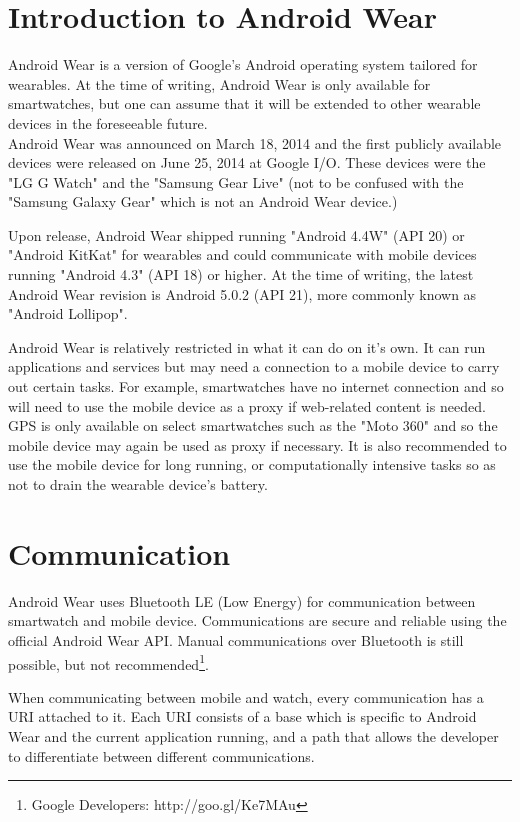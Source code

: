 \section{Introduction to Android Wear}

Android Wear is a version of Google's Android operating system tailored for
wearables. At the time of writing, Android Wear is only available for
smartwatches, but one can assume that it will be extended to other wearable
devices in the foreseeable future.\\
Android Wear was announced on March 18, 2014 and the first publicly available
devices were released on June 25, 2014 at Google I/O. These devices were the
"LG G Watch" and the "Samsung Gear Live" (not to be confused with the
"Samsung Galaxy Gear" which is not an Android Wear device.)

Upon release, Android Wear shipped running "Android 4.4W" (API 20) or "Android
KitKat" for wearables and could communicate with mobile devices running
"Android 4.3" (API 18) or higher. At the time of writing, the latest Android
Wear revision is Android 5.0.2 (API 21), more commonly known as "Android
Lollipop".

Android Wear is relatively restricted in what it can do on it's own. It can run
applications and services but may need a connection to a mobile device to carry
out certain tasks. For example, smartwatches have no internet connection and so
will need to use the mobile device as a proxy if web-related content is needed.
GPS is only available on select smartwatches such as the "Moto 360" and so the
mobile device may again be used as proxy if necessary.
It is also recommended to use the mobile device for long running, or
computationally intensive tasks so as not to drain the wearable device's
battery.

\section{Communication}
Android Wear uses Bluetooth LE (Low Energy) for communication between
smartwatch and mobile device. Communications are secure and reliable using the
official Android Wear API. Manual communications over Bluetooth is still
possible, but not recommended\footnote{Google Developers: http://goo.gl/Ke7MAu}.

When communicating between mobile and watch, every communication has a URI
attached to it. Each URI consists of a base which is specific to Android Wear
and the current application running, and a path that allows the developer to
differentiate between different communications.

